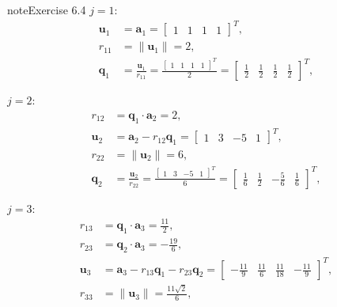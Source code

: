 \documentclass[letterpaper,10pt,english]{jupyterBook}
\begin{document}
\begin{sphinxadmonition}{note}{Exercise 6.4}
\sphinxAtStartPar
\(j = 1\):
\begin{align*}
    \mathbf{u}_{1} &= \mathbf{a}_{1} = \left[\begin{matrix}1 & 1 & 1 & 1\end{matrix}\right]^T, \\
    r_{11} &= \| \mathbf{u}_{1} \| = 2, \\
    \mathbf{q}_{1} &= \frac{\mathbf{u}_{1}}{r_{11}} = \frac{\left[\begin{matrix}1 & 1 & 1 & 1\end{matrix}\right]^T}{2} = \left[\begin{matrix}\frac{1}{2} & \frac{1}{2} & \frac{1}{2} & \frac{1}{2}\end{matrix}\right]^T, \\
     \\
\end{align*}
\sphinxAtStartPar
\(j = 2\):
\begin{align*}
    r_{12} &= \mathbf{q}_{1} \cdot \mathbf{a}_{2} = 2, \\
    \mathbf{u}_{2} &= \mathbf{a}_{2} - r_{12} \mathbf{q}_{1} = \left[\begin{matrix}1 & 3 & -5 & 1\end{matrix}\right]^T, \\
    r_{22} &= \| \mathbf{u}_{2} \| = 6, \\
    \mathbf{q}_{2} &= \frac{\mathbf{u}_{2}}{r_{22}} = \frac{\left[\begin{matrix}1 & 3 & -5 & 1\end{matrix}\right]^T}{6} = \left[\begin{matrix}\frac{1}{6} & \frac{1}{2} & - \frac{5}{6} & \frac{1}{6}\end{matrix}\right]^T, \\
     \\
\end{align*}
\sphinxAtStartPar
\(j = 3\):
\begin{align*}
    r_{13} &= \mathbf{q}_{1} \cdot \mathbf{a}_{3} = \frac{11}{2}, \\
    r_{23} &= \mathbf{q}_{2} \cdot \mathbf{a}_{3} = - \frac{19}{6}, \\
    \mathbf{u}_{3} &= \mathbf{a}_{3} - r_{13} \mathbf{q}_{1} - r_{23} \mathbf{q}_{2} = \left[\begin{matrix}- \frac{11}{9} & \frac{11}{6} & \frac{11}{18} & - \frac{11}{9}\end{matrix}\right]^T, \\
    r_{33} &= \| \mathbf{u}_{3} \| = \frac{11 \sqrt{2}}{6}, \\

\end{align*}
\end{sphinxadmonition}
\end{document}
